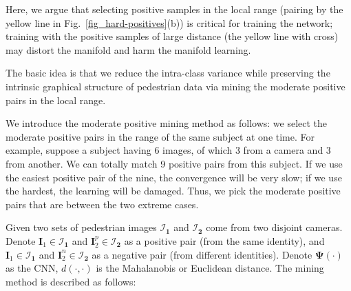 \documentclass[runningheads]{llncs}
\begin{document}
Here, we argue that selecting positive samples in the local range (pairing by the yellow line in Fig.~\ref{fig_hard-positives}(b)) is critical for training the network; training with the positive samples of large distance (the yellow line with cross) may distort the manifold and harm the manifold learning.

The basic idea is that we reduce the intra-class variance while preserving the intrinsic graphical structure of pedestrian data via mining the moderate positive pairs in the local range.

\begin{figure*}[!htbp]
  \centering



  \caption{(a) Some hard positive cases in CUHK03. (b) Illustration of the highly-curved manifold of 3 identities. (c) Gaussian distribution is suitable to perform Mahalanobis metric. Best viewed in color.}
  \label{fig_hard-positives}
\end{figure*}


We introduce the moderate positive mining method as follows: we select the moderate positive pairs in the range of the same subject at one time.
For example, suppose a subject having 6 images, of which 3 from a camera and 3 from another.
We can totally match 9 positive pairs from this subject.
If we use the easiest positive pair of the nine, the convergence will be very slow;
if we use the hardest, the learning will be damaged.
Thus, we pick the moderate positive pairs that are between the two extreme cases.

Given two sets of pedestrian images $\mathcal{I}_\mathbf{1}$ and $\mathcal{I}_\mathbf{2}$  come from two disjoint cameras.
Denote $\mathbf{I}_1 \in \mathcal{I}_\mathbf{1}$ and $\mathbf{I}_2^p \in \mathcal{I}_\mathbf{2}$ as a positive pair (from the same identity),
and $\mathbf{I}_1 \in \mathcal{I}_\mathbf{1}$ and $\mathbf{I}_2^n \in \mathcal{I}_\mathbf{2}$ as a negative pair (from different identities).
Denote $\mathbf{\Psi} (\cdot)$ as the CNN, $ d(\cdot, \cdot) $ is the Mahalanobis or Euclidean distance.
The mining method is described as follows:
\end{document}
